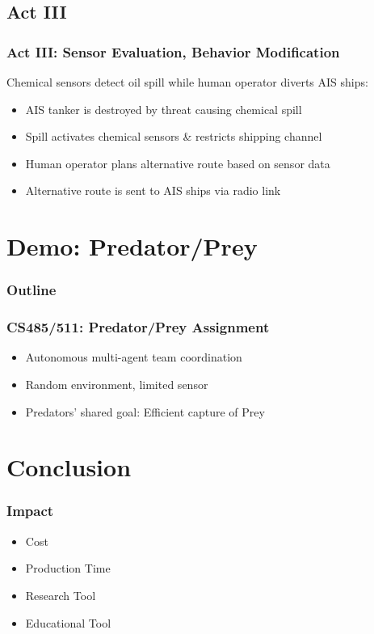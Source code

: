 \documentclass[mathserif,usenames,dvipsnames]{beamer}
\begin{document}
\subsection{Act III}
\frame
{
    \frametitle{Act III: Sensor Evaluation, Behavior Modification}
    Chemical sensors detect oil spill while human operator diverts AIS ships:
    \begin{itemize}
        \item AIS tanker is destroyed by threat causing chemical spill
        \item Spill activates chemical sensors \& restricts shipping channel
        \item Human operator plans alternative route based on sensor data
        \item Alternative route is sent to AIS ships via radio link
    \end{itemize}
}
\section{Demo: Predator/Prey}
\frame
{
    \frametitle{Outline}
    \tableofcontents
}

\frame
{
    \frametitle{CS485/511: Predator/Prey Assignment}
    \begin{itemize}
        \item Autonomous multi-agent team coordination
        \item Random environment, limited sensor
        \item Predators' shared goal: Efficient capture of Prey
    \end{itemize}
}

\section{Conclusion}
\frame
{
    \frametitle{Impact}
    \begin{itemize}
        \item Cost
        \item Production Time
        \item Research Tool
        \item Educational Tool
    \end{itemize}
}
\end{document}
